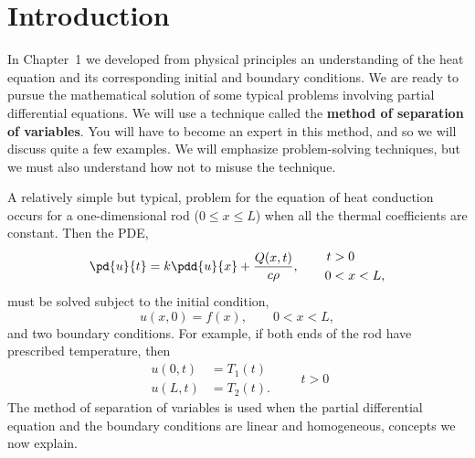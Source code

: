 \section{Introduction}
\label{sec:2.1}

In Chapter~1 we developed from physical principles an understanding of the heat equation and its corresponding initial and boundary conditions. We are ready to pursue the mathematical solution of some typical problems involving partial differential equations. We will use a technique called the \textbf{method of separation of variables}. You will have to become an expert in this method, and so we will discuss quite a few examples. We will emphasize problem-solving techniques, but we must also understand how not to misuse the technique.

A relatively simple but typical, problem for the equation of heat conduction occurs for a one-dimensional rod ($0 \le x \le L$) when all the thermal coefficients are constant. Then the PDE,
\begin{equation}
\label{eq:2.1.1}
\pd{u}{t} = k \pdd{u}{x} + \frac{Q(x,t)}{c\rho}, \qquad
\begin{aligned}
t &> 0 \\
0 &< x < L,
\end{aligned}
\end{equation}
must be solved subject to the initial condition,
\begin{equation}
\label{eq:2.1.2}
u(x,0) = f(x), \qquad 0 < x < L,
\end{equation}
and two boundary conditions. For example, if both ends of the rod have prescribed temperature, then
\begin{equation}
\label{eq:2.1.3}
\begin{aligned}
u(0,t) &= T_1(t) \\
u(L,t) &= T_2(t).
\end{aligned}
\qquad t > 0
\end{equation}
The method of separation of variables is used when the partial differential equation and the boundary conditions are linear and homogeneous, concepts we now explain.
